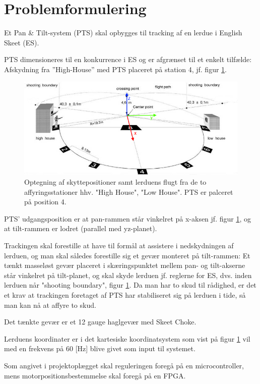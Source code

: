 \section{Problemformulering}
\label{sec:problemformulering}

Et Pan \& Tilt-system (PTS) skal opbygges til tracking af en lerdue i English Skeet (ES).

PTS dimensioneres til en konkurrence i ES og er afgrænset til et enkelt tilfælde:
Afskydning fra ”High-House” med PTS placeret på station 4, jf. figur \ref{fig:ES}.
\begin{figure}[th!]
\centering
\includegraphics[width=1\textwidth]{./graphics/skeet_diagram_cropped_axes}
\caption[Skitse af ES]{Optegning af skyttepositioner samt lerduens flugt fra de to affyringsstationer hhv. "High House", "Low House". PTS er palceret på position 4.}
\label{fig:ES}
\end{figure}	
PTS' udgangsposition er at pan-rammen står vinkelret på x-aksen jf. figur \ref{fig:ES},
og at tilt-rammen er lodret (parallel med yz-planet).

Trackingen skal forestille at have til formål at assistere i nedskydningen af lerduen,
og man skal således forestille sig et gevær monteret på tilt-rammen:
Et tænkt masseløst gevær placeret i skæringspunktet mellem pan- og tilt-akserne står vinkelret
på tilt-planet, og skal skyde lerduen jf. reglerne for ES, dvs. inden lerduen når "shooting boundary", figur \ref{fig:ES}.
Da man har to skud til rådighed, er det et krav at trackingen foretaget af PTS har stabiliseret sig på lerduen
i tide, så man kan nå at affyre to skud.

Det tænkte gevær er et 12 gauge haglgevær med Skeet Choke.

Lerduens koordinater er i det kartesiske koordinatsystem som vist på figur \ref{fig:ES}
vil med en frekvens på 60 [Hz] blive givet som input til systemet.

Som angivet i projektoplægget skal reguleringen foregå på en microcontroller,
mens motorpositionsbestemmelse skal foregå på en FPGA.